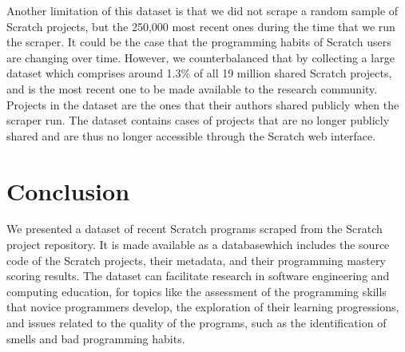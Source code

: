 \documentclass[10pt, conference]{IEEEtran}
\begin{document}
Another limitation of this dataset is that we did not scrape a random sample of Scratch projects, but the 250,000 most recent ones during the time that we run the scraper.
It could be the case that the programming habits of Scratch users are changing over time.
However, we counterbalanced that by collecting a large dataset which comprises around 1.3\% of all 19 million shared Scratch projects, and is the most recent one to be made available to the research community.
Projects in the dataset are the ones that their authors shared publicly when the scraper run. The dataset contains cases of projects that are no longer publicly shared and are thus no longer accessible through the Scratch web interface.

\section{Conclusion}
We presented a dataset of recent Scratch programs scraped from the Scratch project repository.
It is made available as a database\footnotemark[\ref{dataseturl}] which includes the source code of the Scratch projects, their metadata, and their programming mastery scoring results.
The dataset can facilitate research in software engineering and computing education, for topics like the assessment of the programming skills that novice programmers develop, the exploration of their learning progressions, and issues related to the quality of the programs, such as the identification of smells and bad programming habits.



\end{document}
